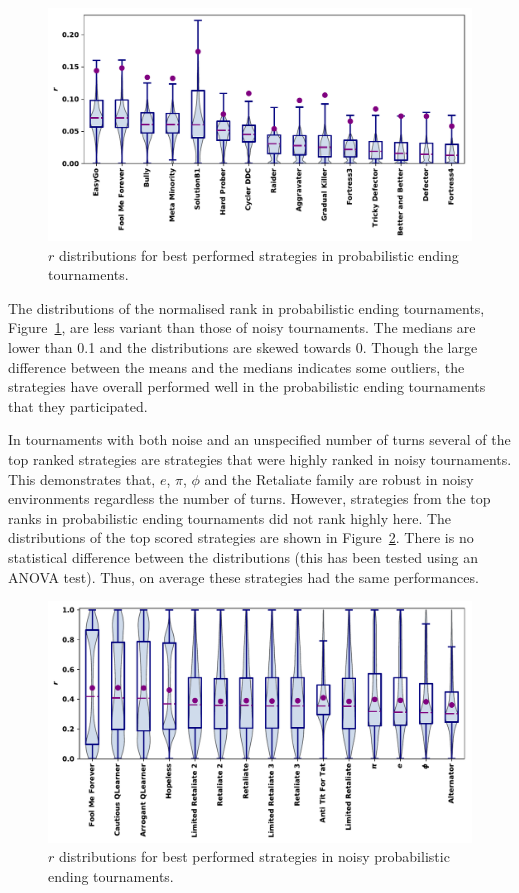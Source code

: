 \documentclass{article}
\begin{document}
\begin{figure}[h!]
    \centering
    \includegraphics[width=.55\textwidth]{../images/performance_probend.pdf}
    \caption{\(r\) distributions for best performed strategies in probabilistic ending tournaments.}
    \label{fig:probend_results}
\end{figure}

The distributions of the normalised rank in probabilistic ending tournaments,
Figure~\ref{fig:probend_results}, are less variant than those of noisy
tournaments. The medians are lower than 0.1 and the distributions are skewed
towards 0. Though the large difference between the means and the medians
indicates some outliers, the strategies have overall performed well in the
probabilistic ending tournaments that they participated.

In tournaments with both noise and an unspecified number of turns several of
the top ranked strategies are strategies that were highly ranked in noisy
tournaments. This demonstrates that, $e$, $\pi$,
$\phi$ and the Retaliate family are robust in noisy environments regardless the
number of turns. However, strategies from the top ranks in probabilistic
ending tournaments did not rank highly here. The distributions of the top scored
strategies are shown in Figure~\ref{fig:noisy_probend_results}. There is no
statistical difference between the distributions (this has been tested using
an ANOVA test). Thus, on average these strategies had the same performances.

\begin{figure}[!htbp]
    \centering
    \includegraphics[width=.55\textwidth]{../images/performance_probend_noise.pdf}
    \caption{\(r\) distributions for best performed strategies in noisy
    probabilistic ending tournaments.}
    \label{fig:noisy_probend_results}
\end{figure}
\end{document}
